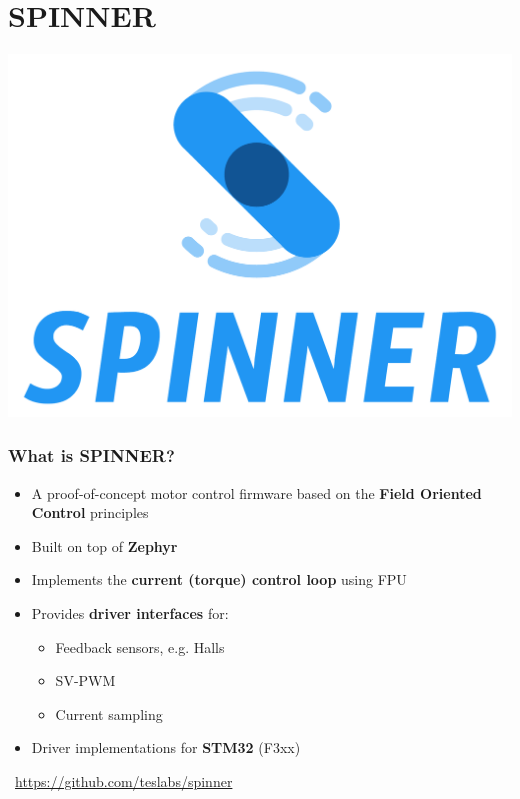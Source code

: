 \documentclass[handout]{beamer}
\begin{document}

\section{SPINNER}

\begin{frame}[plain]{}
  \begin{center}
    \includegraphics[scale=0.2]{spinner.pdf}
  \end{center}
\end{frame}

\begin{frame}
  \frametitle{What is SPINNER?}

  \begin{itemize}
    \item<1-> A proof-of-concept motor control firmware based on the
          \textbf{Field Oriented Control} principles
    \item<2-> Built on top of \textbf{Zephyr}
    \item<3-> Implements the \textbf{current (torque) control loop} using FPU
    \item<4-> Provides \textbf{driver interfaces} for:
          \begin{itemize}
            \item Feedback sensors, e.g. Halls
            \item SV-PWM
            \item Current sampling
          \end{itemize}
    \item<5-> Driver implementations for \textbf{STM32} (F3xx)
  \end{itemize}

  \begin{center}
    \faGithub~\url{https://github.com/teslabs/spinner}
  \end{center}
\end{frame}
\end{document}
